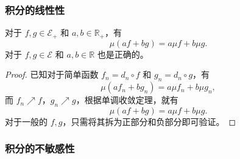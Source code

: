 \documentclass[fontset=none]{Notes}
\begin{document}
\subsubsection{积分的线性性}

\begin{proposition}
  对于 $f,g\in \mathcal{E}_+$ 和 $a,b\in \mathbb{R}_+$，有
  \[
    \mu(af+bg)=a\mu f+b\mu g.  
  \]
  对于 $f,g\in \mathcal{E}$ 和 $a,b\in \mathbb{R}$ 也是正确的。
\end{proposition}
\begin{proof}
  已知对于简单函数 $f_n=d_n\circ f$ 和 $g_n=d_n\circ g$，有
  \[
    \mu(af_n+bg_n)=a\mu f_n+b\mu g_n,  
  \]
  而 $f_n\nearrow f$，$g_n\nearrow g$，根据单调收敛定理，就有
  \[
    \mu(af+bg)=a\mu f+b\mu g.  
  \]
  对于一般的 $f,g$，只需将其拆为正部分和负部分即可验证。
\end{proof}

\subsubsection{积分的不敏感性}
\end{document}
